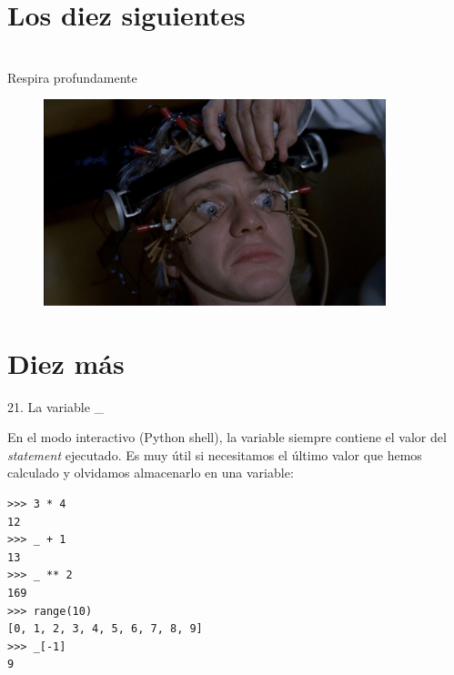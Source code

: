 \documentclass[14pt]{beamer}
\begin{document}
\section{Los diez siguientes}












\section{}

\begin{frame}{}
  \begin{block}{}
    \centering \Large Respira profundamente
  \end{block}

  \begin{figure}
    \centering
    \includegraphics[height=6cm]{pics/a-clockwork-orange-2.jpg}
  \end{figure}
\end{frame}

\section{Diez más}

\begin{frame}[fragile]{21. La variable \_}
  \begin{alertblock}{}
    \small
    \centering
    En el modo interactivo (Python shell), la variable \structure{\_}
    siempre contiene el valor del  \emph{statement}
    ejecutado. Es muy útil si necesitamos  el último
    valor que hemos calculado y olvidamos almacenarlo en una variable:
  \end{alertblock}

  \footnotesize
  \begin{exampleblock}{}
    \begin{lstlisting}
>>> 3 * 4
12
>>> _ + 1
13
>>> _ ** 2
169
>>> range(10)
[0, 1, 2, 3, 4, 5, 6, 7, 8, 9]
>>> _[-1]
9
    \end{lstlisting}
  \end{exampleblock}
\end{frame}
\end{document}
